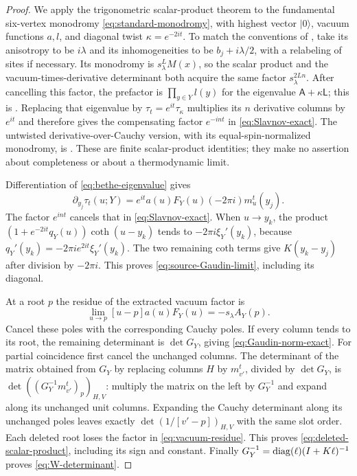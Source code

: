 \begin{proof}
We apply the trigonometric scalar-product theorem to the fundamental
six-vertex monodromy \eqref{eq:standard-monodromy}, with highest vector
$|0\rangle$, vacuum functions $a,l$, and diagonal twist
$\kappa=e^{-2it}$. To match the conventions of
\cite{KMST2005}, take its anisotropy to be $i\lambda$ and its
inhomogeneities to be $b_j+i\lambda/2$, with a relabeling of sites
if necessary. Its monodromy is $s_\lambda^L M(x)$, so the scalar
product and the vacuum-times-derivative determinant both acquire the
same factor $s_\lambda^{2Ln}$. After cancelling this factor, the
prefactor is $\prod_{y\in Y}l(y)$ for the eigenvalue
$\mathsf A+\kappa\mathsf L$; this is
\cite[Proposition~3.1, equations~(3.8)--(3.9)]{KMST2005}.
Replacing that eigenvalue by $\tau_t=e^{it}\tau_\kappa$ multiplies its
$n$ derivative columns by $e^{it}$ and therefore gives the compensating
factor $e^{-int}$ in \eqref{eq:Slavnov-exact}.  The untwisted
derivative-over-Cauchy version, with its equal-spin-normalized
monodromy, is \cite[Theorem~3.1, equations~(3.4)--(3.5)]{KMT1999}.
These are finite scalar-product identities; they make no assertion
about completeness or about a thermodynamic limit.

Differentiation of \eqref{eq:bethe-eigenvalue} gives
\[
 \partial_{y_j}\tau_t(u;Y)
     =e^{it}a(u)F_Y(u)(-2\pi i)m_u^t(y_j).
\]
The factor $e^{int}$ cancels that in
\eqref{eq:Slavnov-exact}.  When $u\to y_k$, the product
$(1+e^{-2it}q_Y(u))\coth(u-y_k)$ tends to
$-2\pi i\xi_Y'(y_k)$, because
$q_Y'(y_k)=-2\pi i e^{2it}\xi_Y'(y_k)$.
The two remaining coth terms give $K(y_k-y_j)$ after division by
$-2\pi i$.  This proves \eqref{eq:source-Gaudin-limit}, including its
diagonal.

At a root $p$ the residue of the extracted vacuum factor is
\begin{equation}\label{eq:vacuum-residue}
 \lim_{u\to p}[u-p]a(u)F_Y(u)=-s_\lambda A_Y(p).
\end{equation}
Cancel these poles with the corresponding Cauchy poles.  If every
column tends to its root, the remaining determinant is $\det G_Y$,
giving \eqref{eq:Gaudin-norm-exact}.  For partial coincidence first
cancel the unchanged columns.  The determinant of the matrix obtained
from $G_Y$ by replacing columns $H$ by $m_{v'}^t$, divided by
$\det G_Y$, is
$\det((G_Y^{-1}m_{v'}^t)_p)_{H,V}$: multiply the matrix on the left by
$G_Y^{-1}$ and expand along its unchanged unit columns.  Expanding the
Cauchy determinant along its unchanged poles leaves exactly
$\det(1/[v'-p])_{H,V}$ with the same slot order.  Each deleted root
loses the factor in \eqref{eq:vacuum-residue}.  This proves
\eqref{eq:deleted-scalar-product}, including its sign and constant.
Finally $G_Y^{-1}=\operatorname{diag}(\ell)(I+K\ell)^{-1}$ proves
\eqref{eq:W-determinant}.


\end{proof}
